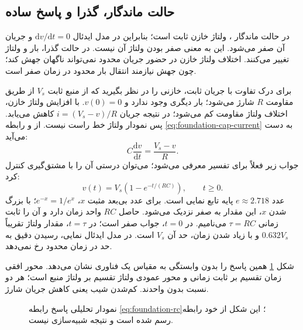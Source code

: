 \subsection{حالت ماندگار، گذرا و پاسخ ساده }
در حالت ماندگار ، ولتاژ خازن ثابت است؛ بنابراین در مدل ایدئال
\(\mathrm{d}v/\mathrm{d}t=0\) و جریان آن صفر می‌شود. این به معنی صفر بودن ولتاژ آن نیست.
در حالت گذرا، بار و ولتاژ تغییر می‌کنند. اختلاف ولتاژ خازن در حضور جریان محدود
نمی‌تواند ناگهان جهش کند؛ چون جهش نیازمند انتقال بار محدود در زمان صفر است.

برای درک تفاوت با جریان ثابت، خازنی را در نظر بگیرید که از منبع ثابت \(V_s\)
از طریق مقاومت \(R\) شارژ می‌شود؛ بار دیگری وجود ندارد و \(v(0)=0\).
با افزایش ولتاژ خازن، اختلاف ولتاژ مقاومت کم می‌شود؛ در نتیجه جریان
\(i=(V_s-v)/R\) کاهش می‌یابد. پس نمودار ولتاژ خط راست نیست.
از  و رابطه \eqref{eq:foundation-cap-current} به دست می‌آید:
\begin{equation}\label{eq:foundation-rc-ode}
C\frac{\mathrm{d}v}{\mathrm{d}t}=\frac{V_s-v}{R}.
\end{equation}
جواب زیر فعلاً برای تفسیر معرفی می‌شود؛ می‌توان درستی آن را با مشتق‌گیری کنترل کرد:
\begin{equation}\label{eq:foundation-rc}
v(t)=V_s\left(1-e^{-t/(RC)}\right),\qquad t\ge0.
\end{equation}
عدد \(e\approx2.718\) پایه تابع نمایی است. برای عدد بی‌بعد مثبت \(x\)،
\(e^{-x}=1/e^x\)؛ با بزرگ شدن \(x\)، این مقدار به صفر نزدیک می‌شود.
حاصل \(RC\) واحد زمان دارد و آن را ثابت زمانی \(\tau=RC\) می‌نامیم.
در \(t=0\)، جواب صفر است؛ در \(t=\tau\)، مقدار ولتاژ تقریباً
\(0.632V_s\) و با زیاد شدن زمان، حد آن \(V_s\) است.
در مدل ایدئال نمایی، رسیدن دقیق به حد در زمان محدود رخ نمی‌دهد.

شکل \ref{fig:foundation-rc} همین پاسخ را بدون وابستگی به مقیاس یک فناوری
نشان می‌دهد. محور افقی زمان تقسیم بر ثابت زمانی و محور عمودی ولتاژ تقسیم بر
ولتاژ منبع است؛ هر دو نسبت بدون واحدند. کم‌شدن شیب یعنی کاهش جریان شارژ.
\begin{figure}[ht]
\centering
\begin{latin}
\end{latin}
\caption{نمودار تحلیلی پاسخ  رابطه \eqref{eq:foundation-rc}؛
این شکل از خود رابطه رسم شده است و نتیجه شبیه‌سازی  نیست.}
\label{fig:foundation-rc}
\end{figure}

